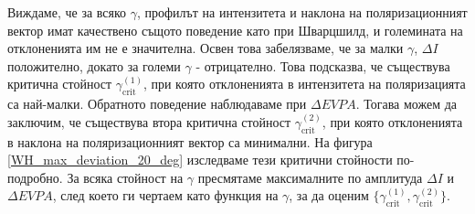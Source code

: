 \newpage

Виждаме, че за всяко $\gamma$, профилът на интензитета и наклона на поляризационният вектор имат качествено същото поведение като при Шварцшилд, и големината на отклоненията им не е значителна. Освен това забелязваме, че за малки $\gamma$, $\Delta I$ положително, докато за големи $\gamma$ - отрицателно. Това подсказва, че съществува критична стойност $\gamma_\text{crit}^{(1)}$, при която отклоненията в интензитета на поляризацията са най-малки. Обратното поведение наблюдаваме при $\Delta EVPA$. Тогава можем да заключим, че съществува втора критична стойност $\gamma_\text{crit}^{(2)}$, при която отклоненията в наклона на поляризационният вектор са минимални. На фигура \ref{WH_max_deviation_20_deg} изследваме тези критични стойности по-подробно. За всяка стойност на $\gamma$ пресмятаме максималните по амплитуда $\Delta I$ и $\Delta EVPA$, след което ги чертаем като функция на $\gamma$, за да оценим $\{\gamma_\text{crit}^{(1)}, \gamma_\text{crit}^{(2)}\}$.

